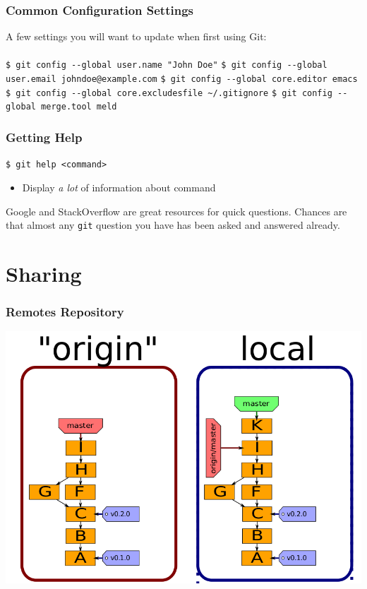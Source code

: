 \documentclass[english,compress]{beamer}
\begin{document}
\begin{frame}[fragile]
    \frametitle{Common Configuration Settings}
	A few settings you will want to update when first using Git:\\ \ \\
	\verb|$ git config --global user.name "John Doe"|
	\verb|$ git config --global user.email johndoe@example.com|
	\verb|$ git config --global core.editor emacs|
	\verb|$ git config --global core.excludesfile ~/.gitignore|
	\verb|$ git config --global merge.tool meld|
\end{frame}

\begin{frame}[fragile]
    \frametitle{Getting Help}

	\verb|$ git help <command>|
	\begin{itemize}
		\item Display \textit{a lot} of information about command
	\end{itemize}

    Google and StackOverflow are great resources for quick questions.
    Chances are that almost any \verb|git| question you have has been
    asked and answered already.

\end{frame}

\section{Sharing}
\begin{frame}[fragile]
    \frametitle{Remotes Repository}
	\begin{center}
		\includegraphics[width=.8\textwidth]{figs/single-remote}
	\end{center}
\end{frame}
\end{document}

